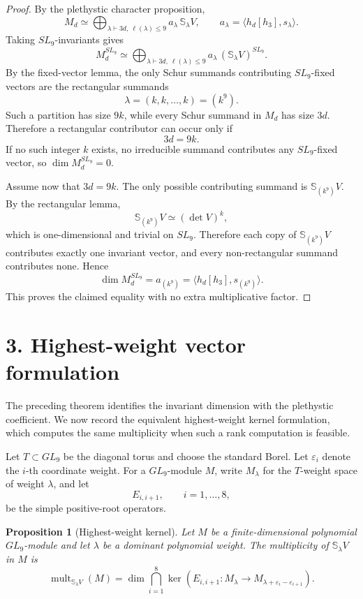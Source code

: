 \documentclass[11pt]{article}
\newtheorem{proposition}{Proposition}
\newcommand{\Schur}{\mathbb S}
\begin{document}
\begin{proof}
By the plethystic character proposition,
\[
    M_d\simeq
    \bigoplus_{\lambda\vdash 3d,\ \ell(\lambda)\leq 9}
    a_\lambda\,\Schur_\lambda V,
    \qquad
    a_\lambda=\big\langle h_d[h_3],s_\lambda\big\rangle.
\]
Taking \(SL_9\)-invariants gives
\[
    M_d^{SL_9}
    \simeq
    \bigoplus_{\lambda\vdash 3d,\ \ell(\lambda)\leq 9}
    a_\lambda\,(\Schur_\lambda V)^{SL_9}.
\]
By the fixed-vector lemma, the only Schur summands contributing
\(SL_9\)-fixed vectors are the rectangular summands
\[
    \lambda=(k,k,\ldots,k)=(k^9).
\]
Such a partition has size \(9k\), while every Schur summand in \(M_d\) has size
\(3d\). Therefore a rectangular contributor can occur only if
\[
    3d=9k.
\]
If no such integer \(k\) exists, no irreducible summand contributes any
\(SL_9\)-fixed vector, so \(\dim M_d^{SL_9}=0\).

Assume now that \(3d=9k\). The only possible contributing summand is
\(\Schur_{(k^9)}V\). By the rectangular lemma,
\[
    \Schur_{(k^9)}V\simeq(\det V)^k,
\]
which is one-dimensional and trivial on \(SL_9\). Therefore each copy of
\(\Schur_{(k^9)}V\) contributes exactly one invariant vector, and every
non-rectangular summand contributes none. Hence
\[
    \dim M_d^{SL_9}
    =
    a_{(k^9)}
    =
    \big\langle h_d[h_3],s_{(k^9)}\big\rangle.
\]
This proves the claimed equality with no extra multiplicative factor.
\end{proof}

\section*{3. Highest-weight vector formulation}

The preceding theorem identifies the invariant dimension with the plethystic
coefficient. We now record the equivalent highest-weight kernel formulation,
which computes the same multiplicity when such a rank computation is feasible.

Let \(T\subset GL_9\) be the diagonal torus and choose the standard Borel. Let
\(\varepsilon_i\) denote the \(i\)-th coordinate weight. For a \(GL_9\)-module
\(M\), write \(M_\lambda\) for the \(T\)-weight space of weight \(\lambda\), and
let
\[
    E_{i,i+1},\qquad i=1,\ldots,8,
\]
be the simple positive-root operators.

\begin{proposition}[Highest-weight kernel]
Let \(M\) be a finite-dimensional polynomial \(GL_9\)-module and let
\(\lambda\) be a dominant polynomial weight. The multiplicity of
\(\Schur_\lambda V\) in \(M\) is
\[
    \operatorname{mult}_{\Schur_\lambda V}(M)
    =
    \dim
    \bigcap_{i=1}^{8}
    \ker\left(
        E_{i,i+1}:M_\lambda\to M_{\lambda+\varepsilon_i-\varepsilon_{i+1}}
    \right).
\]
\end{proposition}
\end{document}
